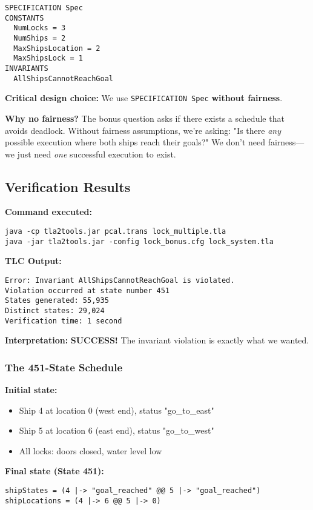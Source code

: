 \documentclass[12pt,a4paper]{article}
\begin{document}
\begin{lstlisting}
SPECIFICATION Spec
CONSTANTS
  NumLocks = 3
  NumShips = 2
  MaxShipsLocation = 2
  MaxShipsLock = 1
INVARIANTS
  AllShipsCannotReachGoal
\end{lstlisting}

\textbf{Critical design choice:} We use \texttt{SPECIFICATION Spec} \textbf{without fairness}.

\textbf{Why no fairness?}
The bonus question asks if there exists a schedule that avoids deadlock. Without fairness assumptions, we're asking: "Is there \textit{any} possible execution where both ships reach their goals?" We don't need fairness---we just need \textit{one} successful execution to exist.

\subsection{Verification Results}

\textbf{Command executed:}
\begin{verbatim}
java -cp tla2tools.jar pcal.trans lock_multiple.tla
java -jar tla2tools.jar -config lock_bonus.cfg lock_system.tla
\end{verbatim}

\textbf{TLC Output:}
\begin{verbatim}
Error: Invariant AllShipsCannotReachGoal is violated.
Violation occurred at state number 451
States generated: 55,935
Distinct states: 29,024
Verification time: 1 second
\end{verbatim}

\textbf{Interpretation:} \checkmark{} \textbf{SUCCESS!} The invariant violation is exactly what we wanted.

\subsubsection{The 451-State Schedule}

\textbf{Initial state:}
\begin{itemize}
    \item Ship 4 at location 0 (west end), status "go\_to\_east"
    \item Ship 5 at location 6 (east end), status "go\_to\_west"
    \item All locks: doors closed, water level low
\end{itemize}

\textbf{Final state (State 451):}
\begin{lstlisting}
shipStates = (4 |-> "goal_reached" @@ 5 |-> "goal_reached")
shipLocations = (4 |-> 6 @@ 5 |-> 0)
\end{lstlisting}
\end{document}

